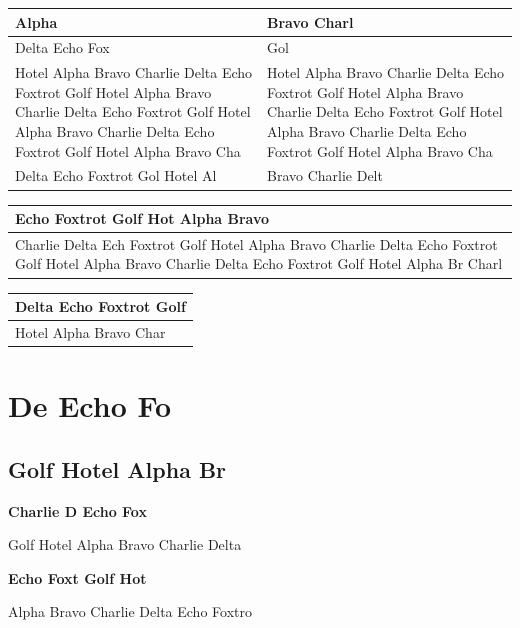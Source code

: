 \documentclass[11pt,a4paper]{article}
\begin{document}
\begin{table}[h]
\begin{tabular}{|l|l|}
\hline
Alpha  & Bravo Charl \\ \hline
Delta Echo Fox & Gol \\ \hline
Hotel Alpha  Bravo Charlie Delta Echo Foxtrot Golf Hotel Alpha Bravo Charlie  Delta Echo Foxtrot Golf Hotel Alpha Bravo Charlie Delta Echo Foxtrot Golf Hotel Alpha Bravo Cha & Hotel Alpha  Bravo Charlie Delta Echo Foxtrot Golf Hotel Alpha Bravo Charlie  Delta Echo Foxtrot Golf Hotel Alpha Bravo Charlie Delta Echo Foxtrot Golf Hotel Alpha Bravo Cha \\ \hline
Delta Echo Foxtrot Gol  Hotel Al & Bravo Charlie Delt \\ \hline
\end{tabular}
\end{table}

\begin{table}[h]
\begin{tabular}{|l|}
\hline
Echo Foxtrot  Golf Hot  Alpha Bravo  \\ \hline
Charlie Delta Ech  Foxtrot Golf Hotel Alpha Bravo Charlie Delta Echo Foxtrot Golf Hotel Alpha Bravo Charlie Delta Echo Foxtrot Golf Hotel Alpha Br  Charl \\ \hline
\end{tabular}
\end{table}

\begin{table}[h]
\begin{tabular}{|l|}
\hline
Delta Echo Foxtrot Golf \\ \hline
Hotel Alpha Bravo Char \\ \hline
\end{tabular}
\end{table}

\section{De	Echo Fo}

\subsection{Golf	Hotel Alpha Br}

\textbf{Charlie D			Echo Fox}

Golf Hotel Alpha Bravo Charlie Delta

\textbf{Echo Foxt			Golf Hot}

Alpha Bravo Charlie Delta Echo Foxtro
\end{document}
